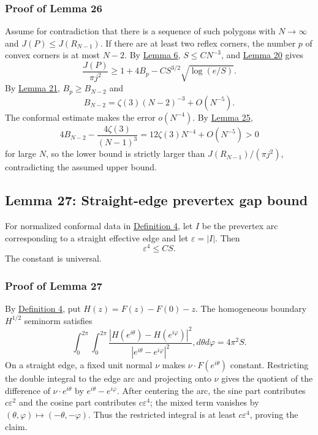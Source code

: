 \documentclass[11pt]{article}
\begin{document}
\subsubsection{Proof of Lemma 26}\label{proof-lem-two-reflex-exclusion}

Assume for contradiction that there is a sequence of such polygons with
\(N\to\infty\) and \(J(P)\le J(R_{N-1})\). If there are at least two
reflex corners, the number \(p\) of convex corners is at most \(N-2\).
By \hyperref[lem-near-circle-conformal]{Lemma 6}, \(S\le CN^{-3}\), and
\hyperref[lem-signed-turn-lower-bound]{Lemma 20} gives \[
\frac{J(P)}{\pi j^2}\ge1+4B_p-C S^{3/2}\sqrt{\log(e/S)}.
\] By \hyperref[lem-bp-asymptotic]{Lemma 21}, \(B_p\ge B_{N-2}\) and \[
B_{N-2}=\zeta(3)(N-2)^{-3}+O(N^{-5}).
\] The conformal estimate makes the error \(o(N^{-4})\). By
\hyperref[lem-regular-polygon-asymptotic]{Lemma 25}, \[
4B_{N-2}-\frac{4\zeta(3)}{(N-1)^3}=12\zeta(3)N^{-4}+O(N^{-5})>0
\] for large \(N\), so the lower bound is strictly larger than
\(J(R_{N-1})/(\pi j^2)\), contradicting the assumed upper bound.

\subsection{Lemma 27: Straight-edge prevertex gap
bound}\label{lem-prevertex-gap}

For normalized conformal data in
\hyperref[def-conformal-data]{Definition 4}, let \(I\) be the prevertex
arc corresponding to a straight effective edge and let
\(\varepsilon=|I|\). Then \[
\varepsilon^4\le CS.
\] The constant is universal.

\subsubsection{Proof of Lemma 27}\label{proof-lem-prevertex-gap}

By \hyperref[def-conformal-data]{Definition 4}, put
\(H(z)=F(z)-F(0)-z\). The homogeneous boundary \(H^{1/2}\) seminorm
satisfies \[
\int_0^{2\pi}\!\int_0^{2\pi}
\frac{|H(e^{i\theta})-H(e^{i\varphi})|^2}{|e^{i\theta}-e^{i\varphi}|^2},d\theta d\varphi
=4\pi^2S.
\] On a straight edge, a fixed unit normal \(\nu\) makes
\(\nu\cdot F(e^{i\theta})\) constant. Restricting the double integral to
the edge arc and projecting onto \(\nu\) gives the quotient of the
difference of \(\nu\cdot e^{i\theta}\) by \(e^{i\theta}-e^{i\varphi}\).
After centering the arc, the sine part contributes \(c\varepsilon^2\)
and the cosine part contributes \(c\varepsilon^4\); the mixed term
vanishes by \((\theta,\varphi)\mapsto(-\theta,-\varphi)\). Thus the
restricted integral is at least \(c\varepsilon^4\), proving the claim.
\end{document}
